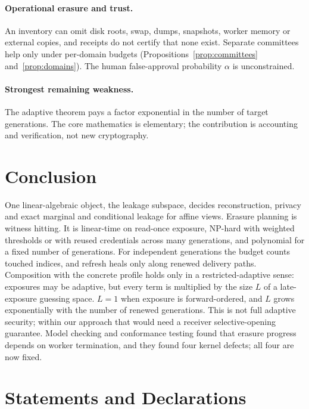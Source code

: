 \documentclass[pdflatex,sn-mathphys-num,twocolumn]{sn-jnl}
\theoremstyle{plain}
\theoremstyle{definition}
\newcommand{\authorinput}[1]{\textbf{[Author-supplied placeholder: #1.]}}
\begin{document}
\paragraph{Operational erasure and trust.}
An inventory can omit disk roots, swap, dumps, snapshots, worker memory or external copies, and receipts do not certify that none exist. Separate committees help only under per-domain budgets (Propositions~\ref{prop:committees} and~\ref{prop:domains}). The human false-approval probability $\alpha$ is unconstrained.

\paragraph{Strongest remaining weakness.}
The adaptive theorem pays a factor exponential in the number of target generations. The core mathematics is elementary; the contribution is accounting and verification, not new cryptography.


\section{Conclusion}
One linear-algebraic object, the leakage subspace, decides reconstruction, privacy and exact marginal and conditional leakage for affine views. Erasure planning is witness hitting. It is linear-time on read-once exposure, NP-hard with weighted thresholds or with reused credentials across many generations, and polynomial for a fixed number of generations. For independent generations the budget counts touched indices, and refresh heals only along renewed delivery paths. Composition with the concrete profile holds only in a restricted-adaptive sense: exposures may be adaptive, but every term is multiplied by the size $L$ of a late-exposure guessing space. $L=1$ when exposure is forward-ordered, and $L$ grows exponentially with the number of renewed generations. This is not full adaptive security; within our approach that would need a receiver selective-opening guarantee. Model checking and conformance testing found that erasure progress depends on worker termination, and they found four kernel defects; all four are now fixed.


\backmatter
\section*{Statements and Declarations}
\end{document}
